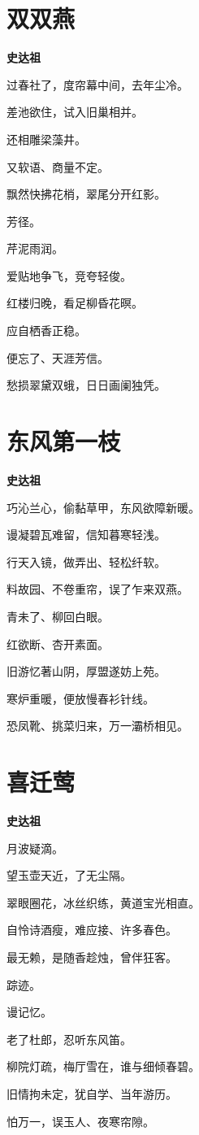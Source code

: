 \documentclass[12pt,a4paper]{ctexbook}
\begin{document}
\section{双双燕}
\textbf{史达祖}\par\vspace{0.5em}
过春社了，度帘幕中间，去年尘冷。\par
差池欲住，试入旧巢相并。\par
还相雕梁藻井。\par
又软语、商量不定。\par
飘然快拂花梢，翠尾分开红影。\par
芳径。\par
芹泥雨润。\par
爱贴地争飞，竞夸轻俊。\par
红楼归晚，看足柳昏花暝。\par
应自栖香正稳。\par
便忘了、天涯芳信。\par
愁损翠黛双蛾，日日画阑独凭。\par

\section{东风第一枝}
\textbf{史达祖}\par\vspace{0.5em}
巧沁兰心，偷黏草甲，东风欲障新暖。\par
谩凝碧瓦难留，信知暮寒轻浅。\par
行天入镜，做弄出、轻松纤软。\par
料故园、不卷重帘，误了乍来双燕。\par
青未了、柳回白眼。\par
红欲断、杏开素面。\par
旧游忆著山阴，厚盟遂妨上苑。\par
寒炉重暖，便放慢春衫针线。\par
恐凤靴、挑菜归来，万一灞桥相见。\par

\section{喜迁莺}
\textbf{史达祖}\par\vspace{0.5em}
月波疑滴。\par
望玉壶天近，了无尘隔。\par
翠眼圈花，冰丝织练，黄道宝光相直。\par
自怜诗酒瘦，难应接、许多春色。\par
最无赖，是随香趁烛，曾伴狂客。\par
踪迹。\par
谩记忆。\par
老了杜郎，忍听东风笛。\par
柳院灯疏，梅厅雪在，谁与细倾春碧。\par
旧情拘未定，犹自学、当年游历。\par
怕万一，误玉人、夜寒帘隙。\par
\end{document}
